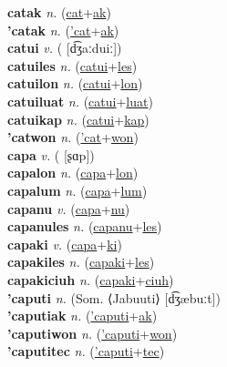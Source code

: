 \textbf{catak} \textit{n.} (\hyperref[cat]{cat}+\hyperref[ak]{ak})
 \label{catak} \\
\textbf{'catak} \textit{n.} (\hyperref['cat]{'cat}+\hyperref[ak]{ak})
 \label{'catak} \\
\textbf{catui} \textit{v.} ( [d͡ʒaːduiː])
 \label{catui} \\
\textbf{catuiles} \textit{n.} (\hyperref[catui]{catui}+\hyperref[les]{les})
 \label{catuiles} \\
\textbf{catuilon} \textit{n.} (\hyperref[catui]{catui}+\hyperref[lon]{lon})
 \label{catuilon} \\
\textbf{catuiluat} \textit{n.} (\hyperref[catui]{catui}+\hyperref[luat]{luat})
 \label{catuiluat} \\
\textbf{catuikap} \textit{n.} (\hyperref[catui]{catui}+\hyperref[kap]{kap})
 \label{catuikap} \\
\textbf{'catwon} \textit{n.} (\hyperref['cat]{'cat}+\hyperref[won]{won})
 \label{'catwon} \\
\textbf{capa} \textit{v.} ( [ʂɑp])
 \label{capa} \\
\textbf{capalon} \textit{n.} (\hyperref[capa]{capa}+\hyperref[lon]{lon})
 \label{capalon} \\
\textbf{capalum} \textit{n.} (\hyperref[capa]{capa}+\hyperref[lum]{lum})
 \label{capalum} \\
\textbf{capanu} \textit{v.} (\hyperref[capa]{capa}+\hyperref[nu]{nu})
 \label{capanu} \\
\textbf{capanules} \textit{n.} (\hyperref[capanu]{capanu}+\hyperref[les]{les})
 \label{capanules} \\
\textbf{capaki} \textit{v.} (\hyperref[capa]{capa}+\hyperref[ki]{ki})
 \label{capaki} \\
\textbf{capakiles} \textit{n.} (\hyperref[capaki]{capaki}+\hyperref[les]{les})
 \label{capakiles} \\
\textbf{capakiciuh} \textit{n.} (\hyperref[capaki]{capaki}+\hyperref[ciuh]{ciuh})
 \label{capakiciuh} \\
\textbf{'caputi} \textit{n.} (Som. ⟨Jabuuti⟩ [d͡ʒæbuːt])
 \label{'caputi} \\
\textbf{'caputiak} \textit{n.} (\hyperref['caputi]{'caputi}+\hyperref[ak]{ak})
 \label{'caputiak} \\
\textbf{'caputiwon} \textit{n.} (\hyperref['caputi]{'caputi}+\hyperref[won]{won})
 \label{'caputiwon} \\
\textbf{'caputitec} \textit{n.} (\hyperref['caputi]{'caputi}+\hyperref[tec]{tec})
 \label{'caputitec} \\
